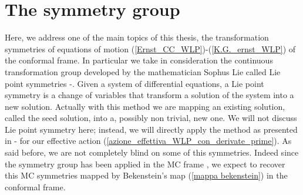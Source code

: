 


\chapter{The symmetry group} \label{Symmetries of CC Ernst's equations}
\thispagestyle{empty}
Here, we address one of the main topics of this thesis, the transformation symmetries of equations of motion (\ref{Ernst_CC_WLP})-(\ref{K.G._ernst_WLP}) of the conformal frame. In particular we take in consideration the continuous transformation group developed by the mathematician Sophus Lie
called Lie point symmetries \citep{stephani}-\citep{stephani_GR}. Given a system of differential equations, a Lie point symmetry is a change of variables that transform a solution of the system into a new solution. Actually with this method we are mapping an existing solution, called the seed solution, into a, possibly non trivial, new one. We will not discuss Lie point symmetry here; instead, we will directly apply the method as presented in \citep{Martelli}-\citep{corti} for our effective action (\ref{azione_effettiva_WLP_con_derivate_prime}). As said before, we are not completely blind on some of this symmetries. Indeed since the symmetry group has been applied in the MC frame \citep{embedding}, we expect to recover this MC symmetries mapped by Bekenstein's map (\ref{mappa bekenstein}) in the conformal frame.

